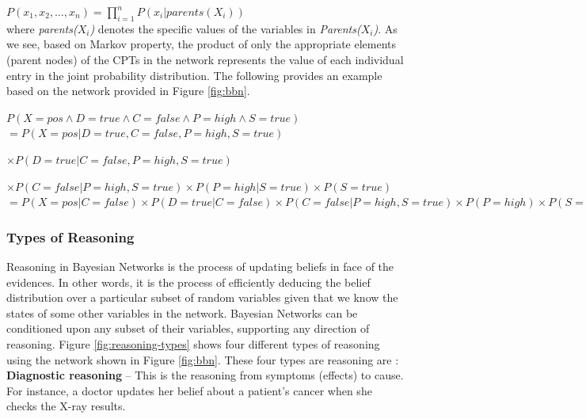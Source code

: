 \documentclass[11pt]{article}
\begin{document}
$P(x_1, x_2, \ldots, x_n) = \prod\limits_{i=1}^{n} P(x_i | parents (X_i))$\\	

\noindent where \textit{parents($X_i$)} denotes the specific values of the
variables in \textit{Parents($X_i$)}. As we see, based on Markov property, the
product of only the appropriate elements (parent nodes) of the CPTs in the
network represents the value of each individual entry in the joint probability
distribution. The following provides an example based on the network provided in
Figure \ref{fig:bbn}.\\

\begin{footnotesize}
\noindent $P(X= pos \wedge D = true \wedge C = false \wedge P = high \wedge S =
true)$\\

\noindent $= P(X= pos | D = true , C = false , P = high , S = true)$

\noindent $\times P(D = true | C = false , P = high , S = true)$

\noindent $\times P(C = false | P = high , S = true) \times P(P = high| S =
true) \times P(S = true)$\\

\noindent $= P(X= pos | C = false) \times P(D = true | C = false) \times P(C =
false | P = high , S = true) \times P(P = high) \times P(S = true)$
\end{footnotesize}

\subsubsection{Types of Reasoning}

Reasoning in Bayesian Networks is the process of updating beliefs in face of the
evidences. In other words, it is the process of efficiently deducing the belief
distribution over a particular subset of random variables given that we know
the states of some other variables in the network. Bayesian Networks can be
conditioned upon any subset of their variables, supporting any direction of
reasoning. Figure \ref{fig:reasoning-types} shows four different types of
reasoning using the network shown in Figure \ref{fig:bbn}. These four types are
reasoning are \cite{korb:bayesian-ai}:\\

\textbf{Diagnostic reasoning} -- This is the reasoning from symptoms (effects)
to cause. For instance, a doctor updates her belief about a patient's cancer
when she checks the X-ray results.
\end{document}
